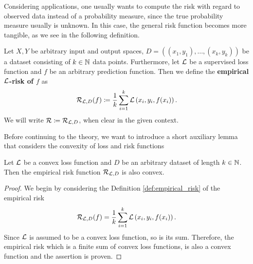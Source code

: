 Considering applications, one usually wants to compute the risk with regard to observed data instead of a probability measure, since the true probability measure usually is unknown. In this case, the general risk function becomes more tangible, as we see in the following definition.


\begin{definition}\label{def:empirical_risk}
Let $X, Y$ be arbitrary input and output spaces, $D = \left((x_1,y_1), \ldots, (x_k,y_k)\right)$ be a dataset consisting of $k\in\operatorname{\mathbb{N}}$ data points. Furthermore, let $\operatorname{\mathcal{L}}$ be a supervised loss function and $f$ be an arbitrary prediction function. Then we define the \textbf{empirical $\operatorname{\mathcal{L}}$-risk of $f$} as
\begin{align*}
\operatorname{\mathcal{R}}_{\operatorname{\mathcal{L}}, D} (f) \coloneqq \frac{1}{k} \sum_{i=1}^{k} \operatorname{\mathcal{L}}\left(x_i, y_i, f(x_i)\right).
\end{align*}
We will write $\operatorname{\mathcal{R}} \coloneqq \operatorname{\mathcal{R}}_{\operatorname{\mathcal{L}}, D}$, when clear in the given context.
\end{definition}


Before continuing to the theory, we want to introduce a short auxiliary lemma that considers the convexity of loss and risk functions

\begin{lemma}\label{lemma:convex_risk}
Let $\operatorname{\mathcal{L}}$ be a convex loss function and $D$ be an arbitrary dataset of length $k\in\operatorname{\mathbb{N}}$.\\
Then the empirical risk function $\operatorname{\mathcal{R}}_{\operatorname{\mathcal{L}}, D}$ is also convex.
\end{lemma}

\begin{proof}
We begin by considering the Definition \ref{def:empirical_risk} of the empirical risk
\begin{align*}
\operatorname{\mathcal{R}}_{\operatorname{\mathcal{L}}, D} (f) = \frac{1}{k} \sum_{i=1}^{k} \operatorname{\mathcal{L}}\left(x_i, y_i, f(x_i)\right).
\end{align*}
Since $\operatorname{\mathcal{L}}$ is assumed to be a convex loss function, so is its sum. Therefore, the empirical risk which is a finite sum of convex loss functions, is also a convex function and the assertion is proven.
\end{proof}


